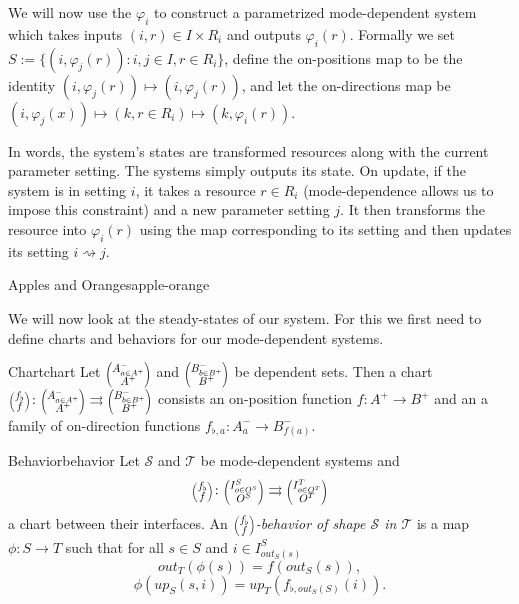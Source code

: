 \documentclass[12pt, a4paper]{article}
\theoremstyle{definition}
\theoremstyle{plain}
\theoremstyle{plain}
\theoremstyle{plain}
\theoremstyle{plain}
\theoremstyle{plain}
\theoremstyle{remark}
\theoremstyle{remark}
\newcommand{\mc}[1]{\mathcal{#1}}
\newcommand{\lens}[2]{\scaleobj{0.6}{\begin{pmatrix} \scaleobj{1.3}{{#1}} \\ \scaleobj{1.3}{{#2}} \end{pmatrix}}}
\begin{document}
We will now use the $\varphi_i$ to construct a parametrized mode-dependent system which takes inputs $(i, r) \in I \times R_i$ and outputs $\varphi_i(r)$. Formally we set $S := \{ (i,\varphi_j(r)) : i,j \in I, r \in R_i \}$, define the on-positions map to be the identity $(i,\varphi_j(r)) \mapsto (i,\varphi_j(r))$, and let the on-directions map be $(i,\varphi_j(x))\mapsto (k,r \in R_i) \mapsto (k,\varphi_i(r))$. 

In words, the system's states are transformed resources along with the current parameter setting. The systems simply outputs its state. On update, if the system is in setting $i$, it takes a resource $r \in R_i$ (mode-dependence allows us to impose this constraint) and a new parameter setting $j$. It then transforms the resource into $\varphi_i(r)$ using the map corresponding to its setting and then updates its setting $i \rightsquigarrow j$.

\begin{tcexample}{Apples and Oranges}{apple-orange}

\end{tcexample}

We will now look at the steady-states of our system. For this we first need to define charts and behaviors for our mode-dependent systems.

\begin{tcdefinition}{Chart}{chart}
	Let $\lens{A^-_{a \in A^+}}{A^+}$ and $\lens{B^-_{b \in B^+}}{B^+}$ be dependent sets. Then a chart $\lens{f_\flat}{f} \colon \lens{A^-_{a \in A^+}}{A^+} \rightrightarrows \lens{B^-_{b \in B^+}}{B^+}$ consists an on-position function $f \colon A^+ \rightarrow B^+$ and an a family of on-direction functions $f_{\flat,a} \colon A^-_a \rightarrow B^-_{f(a)}$.
\end{tcdefinition}

\begin{tcdefinition}{Behavior}{behavior}
	Let $\mc{S}$ and $\mc{T}$ be mode-dependent systems and $$\lens{f_\flat}{f} \colon \lens{I^S_{o \in O^S}}{O^S} \rightrightarrows \lens{I^T_{o \in O^T}}{O^T}$$
	a chart between their interfaces. An \emph{$\lens{f_\flat}{f}$-behavior of shape $\mc{S}$ in $\mc{T}$} is a map $\phi: S \rightarrow T$ such that for all $s \in S$ and $i \in I^S_{out_S(s)}$
	$$out_T(\phi(s)) = f(out_S(s)), $$
	$$\phi(up_S(s,i)) = up_T(f_{\flat,out_S(S)}(i)).$$
\end{tcdefinition}
\end{document}
